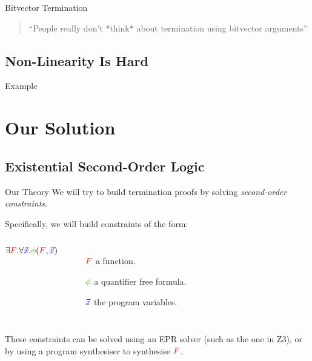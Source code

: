 \documentclass[xcolor=pdftex,t,11pt]{beamer}
\newcommand{\red}[1]{\textcolor{red}{#1}}
\newcommand{\blue}[1]{\textcolor{blue}{#1}}
\newcommand{\green}[1]{\textcolor{ta3chameleon}{#1}}
\begin{document}
\begin{frame}{Bitvector Termination}
\begin{quote}
 ``People really don't *think* about termination using bitvector arguments''
   \hspace*{}
\end{quote}
\end{frame}


\subsection{Non-Linearity Is Hard}



\begin{frame}{Example}
\end{frame}

\section{Our Solution}

\subsection{Existential Second-Order Logic}

\begin{frame}[fragile]{Our Theory}
 We will try to build termination proofs by solving \emph{second-order constraints}.

 \vspace{1em}

 Specifically, we will build constraints of the form:

 \begin{center}
 \begin{columns}
  $\exists \red{F} . \forall \vec{\blue{x}} . \green{\phi}(\red{F}, \vec{\blue{x}})$

  \begin{minipage}{\textwidth}
 \begin{itemize}
  \item[$\red{F}$] a function.
  \item[$\green{\phi}$] a quantifier free formula.
  \item[$\vec{\blue{x}}$] the program variables.
 \end{itemize}
 \end{minipage}
 \end{columns}

 \end{center}

 \vspace{.75em}

 These constraints can be solved using an EPR solver (such as the one in Z3), or by using a program
 synthesiser to synthesise $\red{F}$.
\end{frame}
\end{document}
